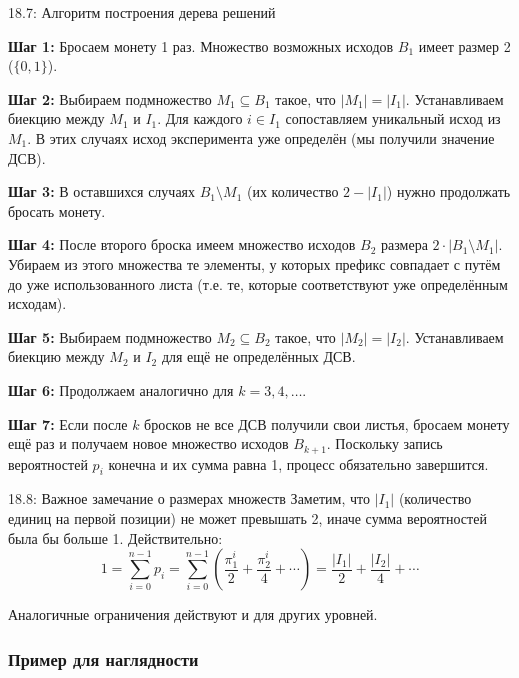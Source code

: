 \documentclass[a4paper,12pt]{article}
\begin{document}
	\begin{algorithmbox}{18.7: Алгоритм построения дерева решений}
		
		\textbf{Шаг 1:} Бросаем монету 1 раз. Множество возможных исходов \(B_1\) имеет размер 2 (\(\{0, 1\}\)).
		
		\textbf{Шаг 2:} Выбираем подмножество \(M_1 \subseteq B_1\) такое, что \(|M_1| = |I_1|\). Устанавливаем биекцию между \(M_1\) и \(I_1\). Для каждого \(i \in I_1\) сопоставляем уникальный исход из \(M_1\). В этих случаях исход эксперимента уже определён (мы получили значение ДСВ).
		
		\textbf{Шаг 3:} В оставшихся случаях \(B_1 \setminus M_1\) (их количество \(2 - |I_1|\)) нужно продолжать бросать монету.
		
		\textbf{Шаг 4:} После второго броска имеем множество исходов \(B_2\) размера \(2 \cdot |B_1 \setminus M_1|\). Убираем из этого множества те элементы, у которых префикс совпадает с путём до уже использованного листа (т.е. те, которые соответствуют уже определённым исходам).
		
		\textbf{Шаг 5:} Выбираем подмножество \(M_2 \subseteq B_2\) такое, что \(|M_2| = |I_2|\). Устанавливаем биекцию между \(M_2\) и \(I_2\) для ещё не определённых ДСВ.
		
		\textbf{Шаг 6:} Продолжаем аналогично для \(k = 3, 4, \dots\).
		
		\textbf{Шаг 7:} Если после \(k\) бросков не все ДСВ получили свои листья, бросаем монету ещё раз и получаем новое множество исходов \(B_{k+1}\). Поскольку запись вероятностей \(p_i\) конечна и их сумма равна 1, процесс обязательно завершится.
	\end{algorithmbox}
	
	\begin{remarkbox}{18.8: Важное замечание о размерах множеств}
		Заметим, что \(|I_1|\) (количество единиц на первой позиции) не может превышать 2, иначе сумма вероятностей была бы больше 1. Действительно:
		\[ 1 = \sum_{i=0}^{n-1} p_i = \sum_{i=0}^{n-1} \left( \frac{\pi_1^i}{2} + \frac{\pi_2^i}{4} + \cdots \right) = \frac{|I_1|}{2} + \frac{|I_2|}{4} + \cdots \]
		
		Аналогичные ограничения действуют и для других уровней.
	\end{remarkbox}
	
	\subsubsection{Пример для наглядности}
	
\end{document}
